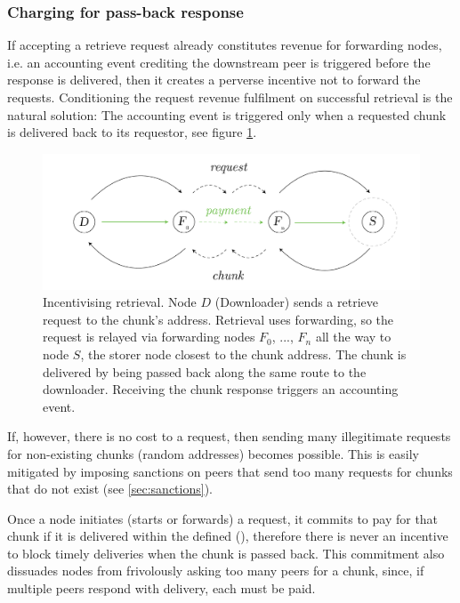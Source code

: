\subsubsection{Charging for pass-back response}

If accepting a retrieve request already constitutes revenue for forwarding nodes, i.e. an accounting event crediting the downstream peer is triggered before the response is delivered, then it creates a perverse incentive not to forward the requests. Conditioning the request revenue fulfilment on successful retrieval is the natural solution: The accounting event is triggered only when a requested chunk is delivered back to its requestor, see figure \ref{fig:retrieval-payment}.


\begin{figure}[htbp]
   \centering
   \includegraphics[width=\textwidth]{fig/retrieval-payment.pdf}
   \caption[Incentivising retrieval \statusgreen]{Incentivising retrieval. Node $D$ (Downloader) sends a retrieve request to the chunk's address. Retrieval uses forwarding, so the request is relayed via forwarding nodes $F_0$, ..., $F_n$ all the way to node $S$, the storer node closest to the chunk address. The chunk is delivered by being passed back along the same route to the downloader. Receiving the chunk response triggers an accounting event.}
   \label{fig:retrieval-payment}
\end{figure}

If, however, there is no cost to a request, then sending many illegitimate requests for non-existing chunks (random addresses) becomes possible. This is easily mitigated by imposing sanctions on peers that send too many requests for chunks that do not exist (see \ref{sec:sanctions}).

Once a node initiates (starts or forwards) a request, it commits to pay for that chunk if it is delivered within the defined  (), therefore there is never an incentive to block timely deliveries when the chunk is passed back.  This commitment also dissuades nodes from frivolously asking too many peers for a chunk, since, if multiple peers respond with delivery, each must be paid.


